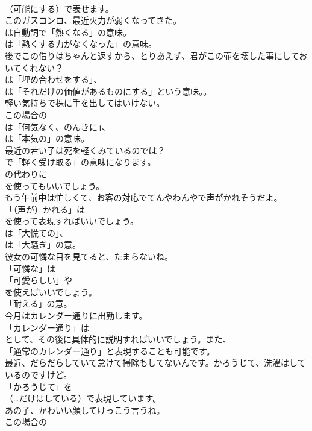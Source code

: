 \documentclass[8pt]{extreport}
\begin{document}
\begin{CJK}{UTF8}{min}
\\	（可能にする）で表せます。	
\\	このガスコンロ、最近火力が弱くなってきた。 
\\	は自動詞で「熱くなる」の意味。
\\	は「熱くする力がなくなった」の意味。	
\\	後でこの借りはちゃんと返すから、とりあえず、君がこの壷を壊した事にしておいてくれない？ 
\\	は「埋め合わせをする」、
\\	は「それだけの価値があるものにする」という意味。。	
\\	軽い気持ちで株に手を出してはいけない。 
\\	この場合の 
\\	は「何気なく、のんきに」、
\\	は「本気の」の意味。	
\\	最近の若い子は死を軽くみているのでは？ 
\\	で「軽く受け取る」の意味になります。
\\	の代わりに
\\	を使ってもいいでしょう。	
\\	もう午前中は忙しくて、お客の対応でてんやわんやで声がかれそうだよ。 
\\	「（声が）かれる」は 
\\	を使って表現すればいいでしょう。
\\	は「大慌ての」、
\\	は「大騒ぎ」の意。	
\\	彼女の可憐な目を見てると、たまらないね。 
\\	「可憐な」は
\\	「可愛らしい」や
\\	を使えばいいでしょう。
\\	「耐える」の意。	
\\	今月はカレンダー通りに出勤します。 
\\	「カレンダー通り」は
\\	として、その後に具体的に説明すればいいでしょう。また、
\\	「通常のカレンダー通り」と表現することも可能です。	
\\	最近、だらだらしていて怠けて掃除もしてないんです。かろうじて、洗濯はしているのですけど。 
\\	「かろうじて」を 
\\	（…だけはしている）で表現しています。	
\\	あの子、かわいい顔してけっこう言うね。 
\\	この場合の

\end{CJK}
\end{document}
